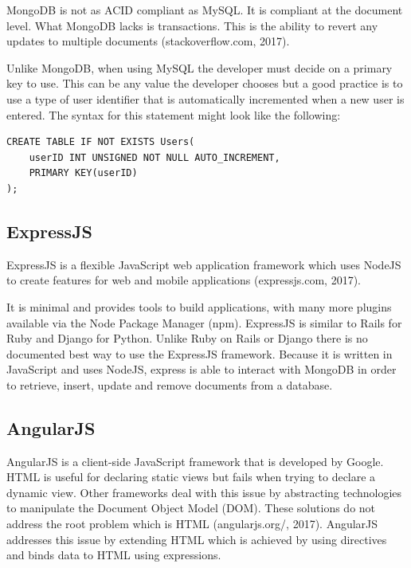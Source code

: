 \documentclass[12pt]{article}
\begin{document}
MongoDB is not as ACID compliant as MySQL. It is compliant at the document level. What MongoDB lacks is transactions. This is the ability to revert any updates to multiple documents (stackoverflow.com, 2017).

Unlike MongoDB, when using MySQL the developer must decide on a primary key to use. This can be any value the developer chooses but a good practice is to use a type of user identifier that is automatically incremented when a new user is entered. The syntax for this statement might look like the following: 


\begin{lstlisting}
CREATE TABLE IF NOT EXISTS Users(
	userID INT UNSIGNED NOT NULL AUTO_INCREMENT,
	PRIMARY KEY(userID)
);
\end{lstlisting}

\subsection{ExpressJS}
ExpressJS is a flexible JavaScript web application framework which uses NodeJS to create features for web and mobile applications (expressjs.com, 2017).

It is minimal and provides tools to build applications, with many more plugins available via the Node Package Manager (npm). ExpressJS is similar to Rails for Ruby and Django for Python. Unlike Ruby on Rails or Django there is no documented best way to use the ExpressJS framework. Because it is written in JavaScript and uses NodeJS, express is able to interact with MongoDB in order to retrieve, insert, update and remove documents from a database.

\subsection{AngularJS}
AngularJS is a client-side JavaScript framework that is developed by Google. HTML is useful for declaring static views but fails when trying to declare a dynamic view. Other frameworks deal with this issue by abstracting technologies to manipulate the Document Object Model (DOM). These solutions do not address the root problem which is HTML (angularjs.org/, 2017). AngularJS addresses this issue by extending HTML which is achieved by using directives and binds data to HTML using expressions.
\end{document}
